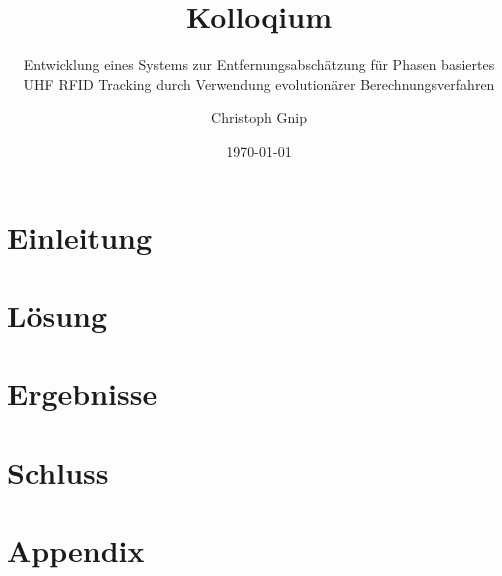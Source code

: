 \documentclass[10pt]{beamer}
\title{Kolloqium}
\subtitle{Entwicklung eines Systems zur
			  Entfernungsabschätzung für
			  Phasen basiertes UHF 
			  RFID Tracking durch 
			  Verwendung evolutionärer
			  Berechnungsverfahren}
\author{Christoph Gnip}
\date{\today}
\begin{document}
\maketitle
\frame{\tableofcontents}

\section{Einleitung}

\section{Lösung}

\section{Ergebnisse}

\section{Schluss}

%
\section{Appendix}



\end{document}

